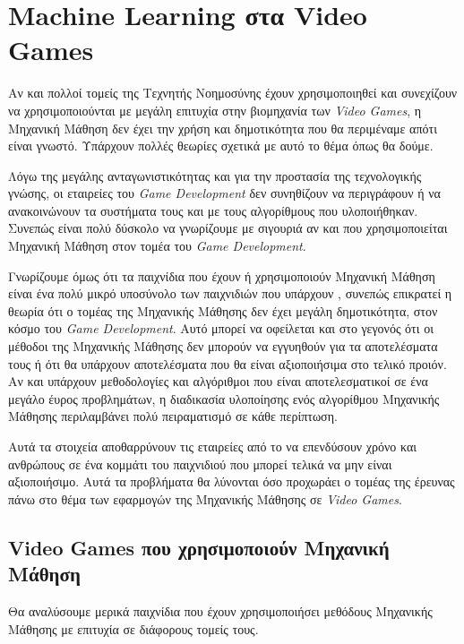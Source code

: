 \section{Machine Learning στα Video Games}
Αν και πολλοί τομείς της Τεχνητής Νοημοσύνης έχουν χρησιμοποιηθεί και συνεχίζουν να χρησιμοποιούνται με μεγάλη επιτυχία στην βιομηχανία των \textit{Video Games}, η Μηχανική Μάθηση δεν έχει την χρήση και δημοτικότητα που θα περιμέναμε απότι είναι γνωστό. Υπάρχουν πολλές θεωρίες σχετικά με αυτό το θέμα όπως θα δούμε. 
\par
Λόγω της μεγάλης ανταγωνιστικότητας και για την προστασία της τεχνολογικής γνώσης, οι εταιρείες του \textit{Game Development} δεν συνηθίζουν να περιγράφουν ή να ανακοινώνουν τα συστήματα τους και με τους αλγορίθμους που υλοποιήθηκαν. Συνεπώς είναι πολύ δύσκολο να γνωρίζουμε με σιγουριά αν και που χρησιμοποιείται Μηχανική Μάθηση στον τομέα του \textit{Game Development}.
\par
Γνωρίζουμε όμως ότι τα παιχνίδια που έχουν ή χρησιμοποιούν Μηχανική Μάθηση είναι ένα πολύ μικρό υποσύνολο των παιχνιδιών που υπάρχουν , συνεπώς επικρατεί η θεωρία ότι ο τομέας της Μηχανικής Μάθησης δεν έχει μεγάλη δημοτικότητα, στον κόσμο του \textit{Game Development}.  Αυτό μπορεί να οφείλεται και στο γεγονός ότι οι μέθοδοι της Μηχανικής Μάθησης δεν μπορούν να εγγυηθούν για τα αποτελέσματα τους ή ότι θα υπάρχουν αποτελέσματα που θα είναι αξιοποιήσιμα στο τελικό προιόν. Αν και υπάρχουν μεθοδολογίες και αλγόριθμοι που είναι αποτελεσματικοί σε ένα μεγάλο έυρος προβλημάτων, η διαδικασία υλοποίησης ενός αλγορίθμου Μηχανικής Μάθησης περιλαμβάνει πολύ πειραματισμό σε κάθε περίπτωση.
\par
Αυτά τα στοιχεία αποθαρρύνουν τις εταιρείες από το να επενδύσουν χρόνο και ανθρώπους σε ένα κομμάτι του παιχνιδιού που μπορεί τελικά να μην είναι αξιοποιήσιμο. Αυτά τα προβλήματα θα λύνονται όσο προχωράει ο τομέας της έρευνας πάνω στο θέμα των εφαρμογών της Μηχανικής Μάθησης σε \textit{Video Games}.

\subsection{Video Games που χρησιμοποιούν Μηχανική Μάθηση}
Θα αναλύσουμε μερικά παιχνίδια που έχουν χρησιμοποιήσει μεθόδους Μηχανικής Μάθησης με επιτυχία σε διάφορους τομείς τους.


